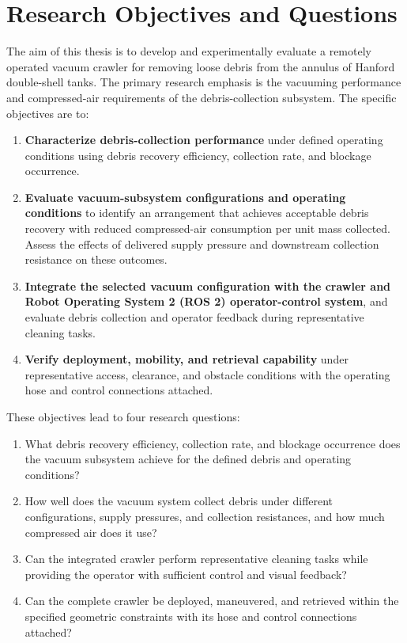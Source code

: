 \section{Research Objectives and Questions}
\label{sec:research-objectives}
The aim of this thesis is to develop and experimentally evaluate a remotely operated vacuum crawler for removing loose debris from the annulus of Hanford double-shell tanks. The primary research emphasis is the vacuuming performance and compressed-air requirements of the debris-collection subsystem. The specific objectives are to:

\begin{enumerate}
\item \textbf{Characterize debris-collection performance} under defined operating conditions using debris recovery efficiency, collection rate, and blockage occurrence.
\item \textbf{Evaluate vacuum-subsystem configurations and operating conditions} to identify an arrangement that achieves acceptable debris recovery with reduced compressed-air consumption per unit mass collected. Assess the effects of delivered supply pressure and downstream collection resistance on these outcomes.
\item \textbf{Integrate the selected vacuum configuration with the crawler and Robot Operating System 2 (ROS 2) operator-control system}, and evaluate debris collection and operator feedback during representative cleaning tasks.
\item \textbf{Verify deployment, mobility, and retrieval capability} under representative access, clearance, and obstacle conditions with the operating hose and control connections attached.
\end{enumerate}

These objectives lead to four research questions:
\begin{enumerate}
\item What debris recovery efficiency, collection rate, and blockage occurrence does the vacuum subsystem achieve for the defined debris and operating conditions?
\item How well does the vacuum system collect debris under different configurations, supply pressures, and collection resistances, and how much compressed air does it use?
\item Can the integrated crawler perform representative cleaning tasks while providing the operator with sufficient control and visual feedback?
\item Can the complete crawler be deployed, maneuvered, and retrieved within the specified geometric constraints with its hose and control connections attached?
\end{enumerate}

